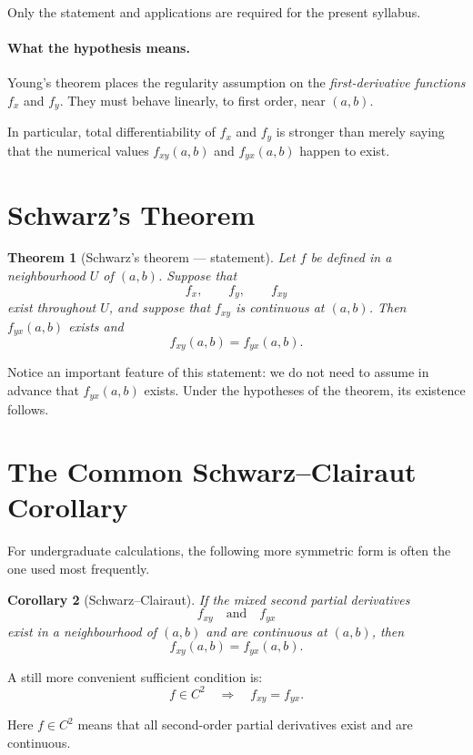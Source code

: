 \documentclass[11pt,oneside]{book}
\theoremstyle{studentthm}
\newtheorem{theorem}{Theorem}[chapter]
\newtheorem{corollary}[theorem]{Corollary}
\theoremstyle{definition}
\begin{document}
Only the statement and applications are required for the present
syllabus.

\paragraph{What the hypothesis means.}
Young's theorem places the regularity assumption on the
\emph{first-derivative functions} \(f_x\) and \(f_y\). They must behave
linearly, to first order, near \((a,b)\).

In particular, total differentiability of \(f_x\) and \(f_y\) is
stronger than merely saying that the numerical values
\(f_{xy}(a,b)\) and \(f_{yx}(a,b)\) happen to exist.

\section{Schwarz's Theorem}

\begin{theorem}[Schwarz's theorem --- statement]
Let \(f\) be defined in a neighbourhood \(U\) of \((a,b)\). Suppose
that
\[
f_x,\qquad f_y,\qquad f_{xy}
\]
exist throughout \(U\), and suppose that \(f_{xy}\) is continuous at
\((a,b)\). Then \(f_{yx}(a,b)\) exists and
\[
f_{xy}(a,b)=f_{yx}(a,b).
\]
\end{theorem}

Notice an important feature of this statement: we do not need to assume
in advance that \(f_{yx}(a,b)\) exists. Under the hypotheses of the
theorem, its existence follows.

\section{The Common Schwarz--Clairaut Corollary}

For undergraduate calculations, the following more symmetric form is
often the one used most frequently.

\begin{corollary}[Schwarz--Clairaut]
If the mixed second partial derivatives
\[
f_{xy}
\quad\text{and}\quad
f_{yx}
\]
exist in a neighbourhood of \((a,b)\) and are continuous at
\((a,b)\), then
\[
f_{xy}(a,b)=f_{yx}(a,b).
\]
\end{corollary}

A still more convenient sufficient condition is:
\[
f\in C^2
\quad\Longrightarrow\quad
f_{xy}=f_{yx}.
\]

Here \(f\in C^2\) means that all second-order partial derivatives exist
and are continuous.
\end{document}
